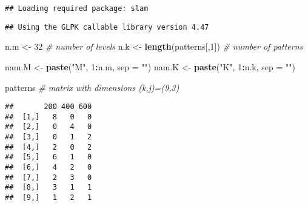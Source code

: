 \documentclass[
]{article}
\newenvironment{Shaded}{\begin{snugshade}}{\end{snugshade}}
\newcommand{\CommentTok}[1]{\textcolor[rgb]{0.56,0.35,0.01}{\textit{#1}}}
\newcommand{\DataTypeTok}[1]{\textcolor[rgb]{0.13,0.29,0.53}{#1}}
\newcommand{\DecValTok}[1]{\textcolor[rgb]{0.00,0.00,0.81}{#1}}
\newcommand{\KeywordTok}[1]{\textcolor[rgb]{0.13,0.29,0.53}{\textbf{#1}}}
\newcommand{\NormalTok}[1]{#1}
\newcommand{\OperatorTok}[1]{\textcolor[rgb]{0.81,0.36,0.00}{\textbf{#1}}}
\newcommand{\StringTok}[1]{\textcolor[rgb]{0.31,0.60,0.02}{#1}}
\begin{document}
\begin{verbatim}
## Loading required package: slam
\end{verbatim}

\begin{verbatim}
## Using the GLPK callable library version 4.47
\end{verbatim}

\begin{Shaded}
\begin{Highlighting}[]
\NormalTok{n.m <-}\StringTok{ }\DecValTok{32}                      \CommentTok{# number of levels}
\NormalTok{n.k <-}\StringTok{ }\KeywordTok{length}\NormalTok{(patterns[,}\DecValTok{1}\NormalTok{])    }\CommentTok{# number of patterns}

\NormalTok{nam.M <-}\StringTok{ }\KeywordTok{paste}\NormalTok{(}\StringTok{"M"}\NormalTok{, }\DecValTok{1}\OperatorTok{:}\NormalTok{n.m, }\DataTypeTok{sep =} \StringTok{""}\NormalTok{)}
\NormalTok{nam.K <-}\StringTok{ }\KeywordTok{paste}\NormalTok{(}\StringTok{"K"}\NormalTok{, }\DecValTok{1}\OperatorTok{:}\NormalTok{n.k, }\DataTypeTok{sep =} \StringTok{""}\NormalTok{)}

\NormalTok{patterns        }\CommentTok{# matrix with dimensions (k,j)=(9,3)}
\end{Highlighting}
\end{Shaded}

\begin{verbatim}
##       200 400 600
##  [1,]   8   0   0
##  [2,]   0   4   0
##  [3,]   0   1   2
##  [4,]   2   0   2
##  [5,]   6   1   0
##  [6,]   4   2   0
##  [7,]   2   3   0
##  [8,]   3   1   1
##  [9,]   1   2   1
\end{verbatim}
\end{document}
